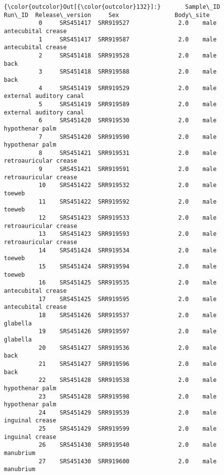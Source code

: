 \documentclass[11pt]{article}
\begin{document}
\begin{Verbatim}[commandchars=\\\{\}]
{\color{outcolor}Out[{\color{outcolor}132}]:}       Sample\_ID     Run\_ID  Release\_version     Sex                Body\_site
          0     SRS451417  SRR919527              2.0    male       antecubital crease
          1     SRS451417  SRR919587              2.0    male       antecubital crease
          2     SRS451418  SRR919528              2.0    male                     back
          3     SRS451418  SRR919588              2.0    male                     back
          4     SRS451419  SRR919529              2.0    male  external auditory canal
          5     SRS451419  SRR919589              2.0    male  external auditory canal
          6     SRS451420  SRR919530              2.0    male          hypothenar palm
          7     SRS451420  SRR919590              2.0    male          hypothenar palm
          8     SRS451421  SRR919531              2.0    male    retroauricular crease
          9     SRS451421  SRR919591              2.0    male    retroauricular crease
          10    SRS451422  SRR919532              2.0    male                   toeweb
          11    SRS451422  SRR919592              2.0    male                   toeweb
          12    SRS451423  SRR919533              2.0    male    retroauricular crease
          13    SRS451423  SRR919593              2.0    male    retroauricular crease
          14    SRS451424  SRR919534              2.0    male                   toeweb
          15    SRS451424  SRR919594              2.0    male                   toeweb
          16    SRS451425  SRR919535              2.0    male       antecubital crease
          17    SRS451425  SRR919595              2.0    male       antecubital crease
          18    SRS451426  SRR919537              2.0    male                 glabella
          19    SRS451426  SRR919597              2.0    male                 glabella
          20    SRS451427  SRR919536              2.0    male                     back
          21    SRS451427  SRR919596              2.0    male                     back
          22    SRS451428  SRR919538              2.0    male          hypothenar palm
          23    SRS451428  SRR919598              2.0    male          hypothenar palm
          24    SRS451429  SRR919539              2.0    male          inguinal crease
          25    SRS451429  SRR919599              2.0    male          inguinal crease
          26    SRS451430  SRR919540              2.0    male                manubrium
          27    SRS451430  SRR919600              2.0    male                manubrium

\end{Verbatim}
\end{document}
